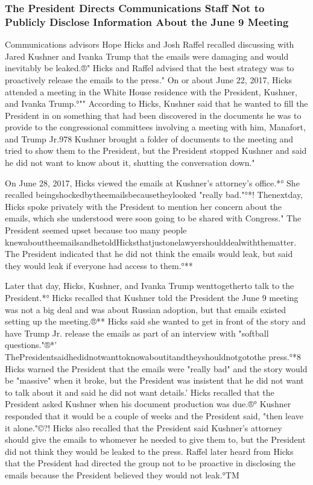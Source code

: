 \subsubsection{The President Directs Communications Staff Not to Publicly Disclose Information About the June 9 Meeting}

Communications advisors Hope Hicks and Josh Raffel recalled discussing with Jared Kushner and Ivanka Trump that the emails were damaging and would inevitably be leaked.®"
Hicks and Raffel advised that the best strategy was to proactively release the emails to the press."
On or about June 22, 2017, Hicks attended a meeting in the White House residence with the President, Kushner, and Ivanka Trump.°""
According to Hicks, Kushner said that he wanted to fill the President in on something that had been discovered in the documents he was to provide to the congressional committees involving a meeting with him, Manafort, and Trump Jr.978
Kushner brought a folder of documents to the meeting and tried to show them to the President, but the President stopped Kushner and said he did not want to know about it, shutting the conversation down."

On June 28, 2017, Hicks viewed the emails at Kushner's attorney's office.*°
She recalled beingshockedbytheemailsbecausetheylooked "really bad."°*!
Thenextday, Hicks spoke privately with the President to mention her concern about the emails, which she understood were soon going to be shared with Congress."
The President seemed upset because too many people knewabouttheemailsandhetoldHicksthatjustonelawyershoulddealwiththematter.
The President indicated that he did not think the emails would leak, but said they would leak if everyone had access to them.°**

Later that day, Hicks, Kushner, and Ivanka Trump wenttogetherto talk to the President.*°
Hicks recalled that Kushner told the President the June 9 meeting was not a big deal and was about Russian adoption, but that emails existed setting up the meeting.®**
Hicks said she wanted to get in front of the story and have Trump Jr. release the emails as part of an interview with "softball questions."®*'
ThePresidentsaidhedidnotwanttoknowaboutitandtheyshouldnotgotothe press.°*8
Hicks warned the President that the emails were "really bad" and the story would be "massive" when it broke, but the President was insistent that he did not want to talk about it and said he did not want details.'
Hicks recalled that the President asked Kushner when his document production was due.®°
Kushner responded that it would be a couple of weeks and the President said, "then leave it alone."©?!
Hicks also recalled that the President said Kushner's attorney should give the emails to whomever he needed to give them to, but the President did not think they would be leaked to the press.
Raffel later heard from Hicks that the President had directed the group not to be proactive in disclosing the emails because the President believed they would not leak.°TM

